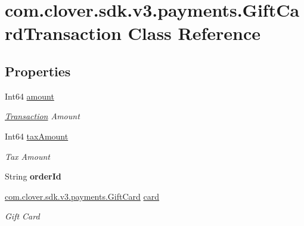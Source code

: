 \hypertarget{classcom_1_1clover_1_1sdk_1_1v3_1_1payments_1_1_gift_card_transaction}{}\section{com.\+clover.\+sdk.\+v3.\+payments.\+Gift\+Card\+Transaction Class Reference}
\label{classcom_1_1clover_1_1sdk_1_1v3_1_1payments_1_1_gift_card_transaction}
\subsection*{Properties}
\begin{DoxyCompactItemize}
\item 
Int64 \hyperlink{classcom_1_1clover_1_1sdk_1_1v3_1_1payments_1_1_gift_card_transaction_a07a718c4cacd36d8f4406c3b86e3db5a}{amount}
\begin{DoxyCompactList}\small\item\em \hyperlink{classcom_1_1clover_1_1sdk_1_1v3_1_1payments_1_1_transaction}{Transaction} Amount \end{DoxyCompactList}\item 
Int64 \hyperlink{classcom_1_1clover_1_1sdk_1_1v3_1_1payments_1_1_gift_card_transaction_a2c46346c29a55029673305b57344326d}{tax\+Amount}
\begin{DoxyCompactList}\small\item\em Tax Amount \end{DoxyCompactList}\item 
\mbox{\label{classcom_1_1clover_1_1sdk_1_1v3_1_1payments_1_1_gift_card_transaction_a71fe2c312e91eb57e3591de569152f88}} 
String {\bfseries order\+Id}
\item 
\hyperlink{classcom_1_1clover_1_1sdk_1_1v3_1_1payments_1_1_gift_card}{com.\+clover.\+sdk.\+v3.\+payments.\+Gift\+Card} \hyperlink{classcom_1_1clover_1_1sdk_1_1v3_1_1payments_1_1_gift_card_transaction_a8671fb98a141ca628255548e99427a45}{card}
\begin{DoxyCompactList}\small\item\em Gift Card \end{DoxyCompactList}\item 

\end{DoxyCompactItemize}
